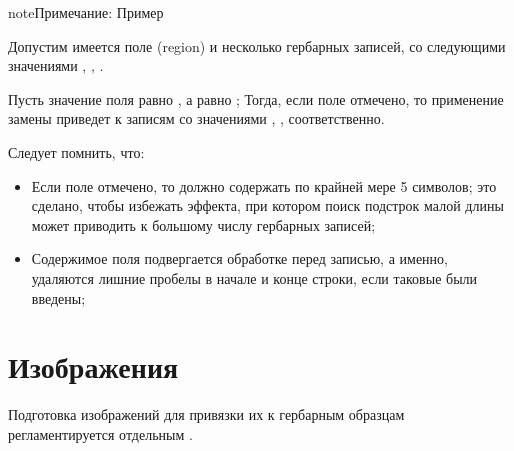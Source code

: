 \documentclass[letterpaper,10pt,russian]{sphinxmanual}
\begin{document}
\begin{sphinxadmonition}{note}{Примечание:}
Пример

Допустим имеется поле  (region) и несколько гербарных записей, со следующими
значениями , , .

Пусть значение поля  равно , а  равно
;
Тогда, если поле  отмечено, то применение
замены приведет к записям со значениями , , 
соответственно.
\end{sphinxadmonition}

Следует помнить, что:
\begin{itemize}
\item {} 
Если поле  отмечено,
то  должно содержать по крайней мере 5 символов;
это сделано, чтобы избежать эффекта, при котором
поиск подстрок малой длины может приводить к большому числу гербарных записей;

\item {} 
Содержимое поля  подвергается обработке перед записью,
а именно, удаляются лишние пробелы в начале и конце строки,
если таковые были введены;

\end{itemize}


\section{Изображения}
\label{\detokenize{main:id61}}
Подготовка изображений для привязки их к
гербарным образцам регламентируется отдельным {\hyperref[\detokenize{scanning::doc}]{}}.
\end{document}

